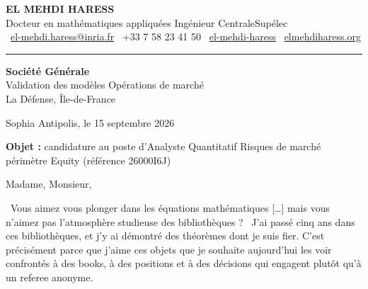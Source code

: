\documentclass[10pt,a4paper]{article}
\begin{document}
{\headingfont\bfseries\fontsize{20}{23}\selectfont EL MEHDI HARESS}\\[0.7ex]
{\headingfont\fontsize{10.5}{13}\selectfont\color{accent}%
Docteur en mathématiques appliquées \textbar{} Ingénieur CentraleSupélec}\\[1.0ex]
{\small
\faEnvelope[regular]~\href{mailto:el-mehdi.haress@inria.fr}{el-mehdi.haress@inria.fr}\quad
\faPhone*~+33 7 58 23 41 50\quad
\faLinkedin~\href{https://www.linkedin.com/in/el-mehdi-haress-67750b3aa/}{el-mehdi-haress}\quad
\faGlobe~\href{https://elmehdiharess.org}{elmehdiharess.org}
}

\vspace{0.4ex}
{\color{rulegray}\rule{\linewidth}{0.7pt}}

\vspace{1.2ex}

\begin{minipage}[t]{0.5\textwidth}
\vspace{0pt}\raggedright\small
\textbf{Société Générale}\\
Validation des modèles \textemdash{} Opérations de marché\\
La Défense, Île-de-France
\end{minipage}\hfill
\begin{minipage}[t]{0.42\textwidth}
\vspace{0pt}\raggedleft\small
Sophia Antipolis, le 15 septembre 2026
\end{minipage}

\vspace{2.2ex}

{\small\textbf{Objet :} candidature au poste d'Analyste Quantitatif Risques de marché \textemdash{} périmètre
Equity (référence 26000I6J)}

\vspace{2.2ex}

Madame, Monsieur,

\og~Vous aimez vous plonger dans les équations mathématiques […] mais vous n'aimez pas l'atmosphère studieuse
des bibliothèques ?~\fg{} J'ai passé cinq ans dans ces bibliothèques, et j'y ai démontré des théorèmes dont je
suis fier. C'est précisément parce que j'aime ces objets que je souhaite aujourd'hui les voir confrontés à des
books, à des positions et à des décisions qui engagent \textemdash{} plutôt qu'à un referee anonyme.
\end{document}
